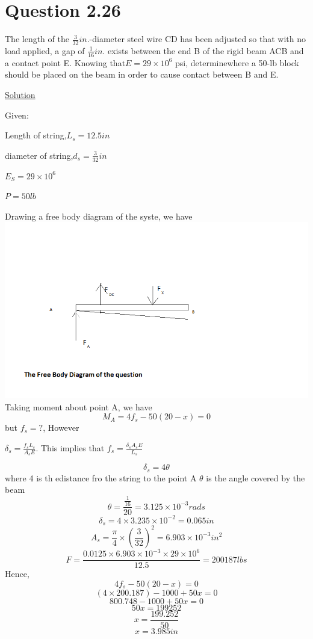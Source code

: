 \documentclass{article}
\begin{document}
\section*{Question 2.26}
The length of the $\frac{3}{32}in$.-diameter steel wire CD has been adjusted so that with no load applied, a gap of $\frac{1}{16}in$. exists between the end B of the rigid beam ACB and a contact point E. Knowing that$ E=29 \times 10^{6}$ psi, determinewhere a 50-lb block should be placed on the beam in order to cause contact between B and E.
\begin{center}\underline{ Solution}\end{center}
Given:
\begin{center}Length of string,$ L_{s} = 12.5 in$\end{center}
\begin{center}diameter of string,$d_{s} = \frac{3}{32}in$\end{center}
\begin{center}$E_{S} = 29 \times 10^{6}$\end{center}
\begin{center}$P = 50lb$\end{center}
Drawing a free body diagram of the syste, we have 
\newline
\includegraphics{untitled}
\newline
Taking moment about point A, we have
\[M_{A} = 4f_{s} - 50 (20 -x) = 0\]
but $f_{s} = ?$, However
\begin{center}$\delta_{s} = \frac{f_{s}L_{s}}{A_{s}E}$.  This implies that $f_{s} = \frac{\delta_{s}A_{s}E}{L_{s}}$\end{center}
\[\delta_{s} = 4 \theta\]
where 4 is th edistance fro the string to the point A
\newline
$\theta$ is the angle covered by the beam
\[\theta = \frac{\frac{1}{16}}{20} = 3.125 \times 10^{-3}rads\]
\[\delta_{s} = 4\times 3.235 \times 10^{-2} = 0.065in\]
\[A_{s} = \frac{\pi}{4} \times (\frac{3}{32})^{2} = 6.903 \times 10^{-3}in^{2}\]
\[F = \frac{0.0125 \times 6.903 \times 10^{-3} \times 29 \times 10^{6}}{12.5} = 200187lbs\]
Hence,
\[4f_{s} - 50(20-x) = 0\]
\[(4\times200.187) - 1000 + 50x = 0\]
\[800.748 - 1000 + 50x = 0\]
\[50x = 199252\]
\[ x = \frac{199.252}{50}\]
\[x = 3.985in\]
\end{document}

